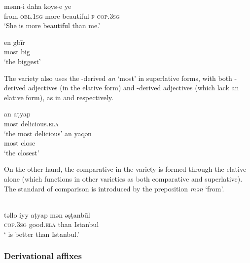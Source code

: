 \documentclass[output=paper]{langsci/langscibook}
\begin{document}
\ea \label{adj}  
		\ea \label{adj1}\gll mənn-i daha koys-e ye\\
   from-\textsc{obl.1sg} more beautiful-\textsc{f} \textsc{cop.3sg} \\
        \glt `She is more beautiful than me.'


	\ex \label{adj2} \gll en gbīr  \\
        most big\\
        \glt `the biggest'
\z
\z

\noindent The  variety also uses the -derived \textit{an} `most' in {superlative} forms, with both -derived adjectives (in the {elative} form) and -derived adjectives (which lack an {elative} form), as in  and  respectively.\largerpage

\ea \label{adjt}
{\multicolsep=0pt\begin{multicols}{2}\raggedcolumns
		\ea \label{adjt1}\gll an\footnotemark	 {} aṭyap\\
    most	delicious.\textsc{ela} \\
        \glt `the most delicious'\columnbreak
	\ex \label{adjt2} \gll an 	yāqən  \\
        most	close\\
        \glt `the closest'
\z
\end{multicols}}
\z
\clearpage

\noindent  On the other hand, the {comparative} in the  variety is formed through the {elative} alone (which functions in other  varieties as both {comparative} and {superlative}). The standard of comparison is introduced by the {preposition} \textit{mən} `from'.

\ea\label{adjt3} \\
\gll təllo 	iyy 		aṭyap mən 	ə\d{s}ṭanbūl\\
     	\textsc{cop.3sg}	good.\textsc{ela}	than	Istanbul \\
\glt ` is better than Istanbul.'
\z



\subsubsection{Derivational affixes}
\end{document}
